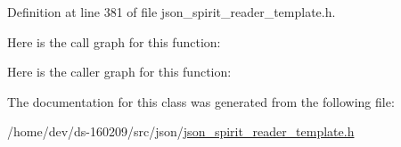 Definition at line 381 of file json\+\_\+spirit\+\_\+reader\+\_\+template.\+h.



Here is the call graph for this function\+:




Here is the caller graph for this function\+:




The documentation for this class was generated from the following file\+:\begin{DoxyCompactItemize}
\item 
/home/dev/ds-\/160209/src/json/\hyperlink{json__spirit__reader__template_8h}{json\+\_\+spirit\+\_\+reader\+\_\+template.\+h}\end{DoxyCompactItemize}
